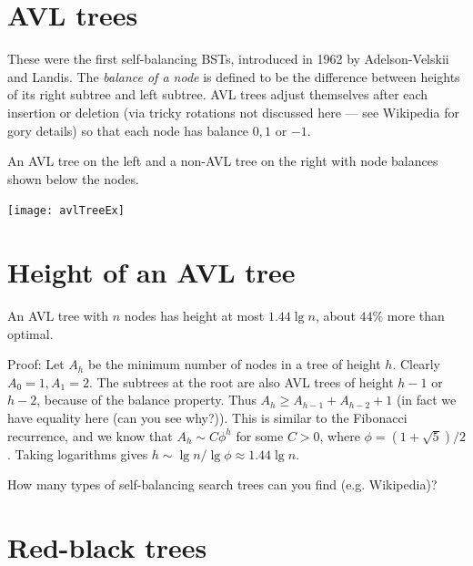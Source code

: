 \section*{AVL trees}

These were the first self-balancing BSTs, introduced in 1962 by Adelson-Velskii and Landis. 
The \emph{balance of a node} is defined to be the difference between heights of its 
right subtree and left subtree. AVL trees adjust themselves after each insertion 
or deletion (via tricky rotations not discussed here --- see Wikipedia for gory details) so that each node has balance $0, 1$ or $-1$.

\begin{Boxample} \label{ex:avlTreeEx}
An AVL tree on the left and a non-AVL tree on the right with node balances shown below the nodes.
\begin{center}
  \texttt{[image: avlTreeEx]}
\end{center}
\end{Boxample}

\section*{Height of an AVL tree}
\begin{Boxample}
An AVL tree with $n$ nodes has height at most $1.44 \lg n$, about $44\%$ more 
than optimal.

Proof: Let $A_h$ be the minimum number of nodes in a tree of height $h$. Clearly 
$A_0 = 1, A_1 = 2$. The subtrees at the root are also AVL trees of height $h-1$ or $h-2$, 
because of the balance property. Thus $A_h \geq A_{h-1} + A_{h-2} + 1$ (in fact we have equality here 
(can you see why?)). This is similar to the Fibonacci recurrence, and we know that 
$A_h \sim C \phi^h$ for some $C>0$, where $\phi = (1+\sqrt{5})/2$. 
Taking logarithms gives $h \sim \lg n / \lg \phi \approx 1.44 \lg n$. 
\end{Boxample}

\begin{Boxample}[2]
How many types of self-balancing search trees can you find (e.g. Wikipedia)?

\end{Boxample}

\section*{Red-black trees}

